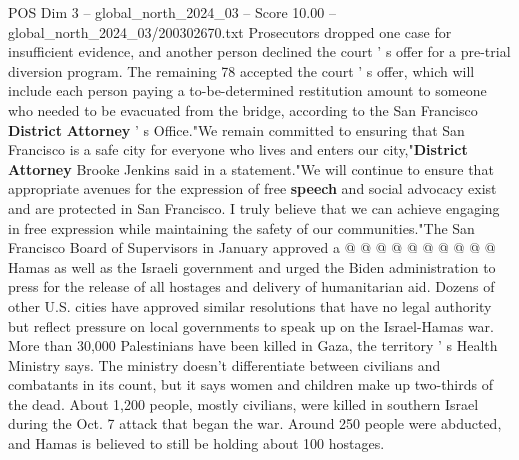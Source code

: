 \begin{textsample}{POS Dim 3 – global\_north\_2024\_03 – Score 10.00 – global\_north\_2024\_03/200302670.txt}
Prosecutors dropped one case for insufficient evidence, and another person declined the court ' s offer for a pre-trial diversion program.
The remaining 78 accepted the court ' s offer, which will include each person paying a to-be-determined restitution amount to someone who needed to be evacuated from the bridge, according to the San Francisco \textbf{District} \textbf{Attorney} ' s Office."We remain committed to ensuring that San Francisco is a safe city for everyone who lives and enters our city,"\textbf{District} \textbf{Attorney} Brooke Jenkins said in a statement."We will continue to ensure that appropriate avenues for the expression of free \textbf{speech} and social advocacy exist and are protected in San Francisco.
I truly believe that we can achieve engaging in free expression while maintaining the safety of our communities."The San Francisco Board of Supervisors in January approved a @ @ @ @ @ @ @ @ @ @ Hamas as well as the Israeli government and urged the Biden administration to press for the release of all hostages and delivery of humanitarian aid.
Dozens of other U.S. cities have approved similar resolutions that have no legal authority but reflect pressure on local governments to speak up on the Israel-Hamas war.
More than 30,000 Palestinians have been killed in Gaza, the territory ' s Health Ministry says.
The ministry doesn't differentiate between civilians and combatants in its count, but it says women and children make up two-thirds of the dead.
About 1,200 people, mostly civilians, were killed in southern Israel during the Oct. 7 attack that began the war.
Around 250 people were abducted, and Hamas is believed to still be holding about 100 hostages.

\end{textsample}
